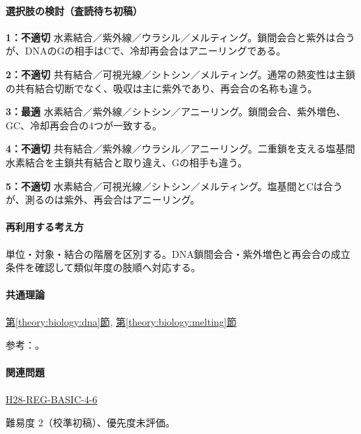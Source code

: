 \paragraph{選択肢の検討（査読待ち初稿）}\mbox{}\par

\noindent\textbf{1：不適切} 水素結合／紫外線／ウラシル／メルティング。鎖間会合と紫外は合うが、DNAのGの相手はCで、冷却再会合はアニーリングである。\par

\noindent\textbf{2：不適切} 共有結合／可視光線／シトシン／メルティング。通常の熱変性は主鎖の共有結合切断でなく、吸収は主に紫外であり、再会合の名称も違う。\par

\noindent\textbf{3：最適} 水素結合／紫外線／シトシン／アニーリング。鎖間会合、紫外増色、GC、冷却再会合の4つが一致する。\par

\noindent\textbf{4：不適切} 共有結合／紫外線／ウラシル／アニーリング。二重鎖を支える塩基間水素結合を主鎖共有結合と取り違え、Gの相手も違う。\par

\noindent\textbf{5：不適切} 水素結合／可視光線／シトシン／メルティング。塩基間とCは合うが、測るのは紫外、再会合はアニーリング。\par

\paragraph{再利用する考え方} 単位・対象・結合の階層を区別する。DNA鎖間会合・紫外増色と再会合の成立条件を確認して類似年度の肢順へ対応する。

\paragraph{共通理論} \hyperref[theory:biology:dna]{第\ref*{theory:biology:dna}節}, \hyperref[theory:biology:melting]{第\ref*{theory:biology:melting}節}

\par 参考：\cite{bu_dna_melting,nhgri_dna}。

\paragraph{関連問題} \hyperref[q:h28-reg-basic-4-6]{H28-REG-BASIC-4-6}

\par 難易度 2（校準初稿）、優先度未評価。

